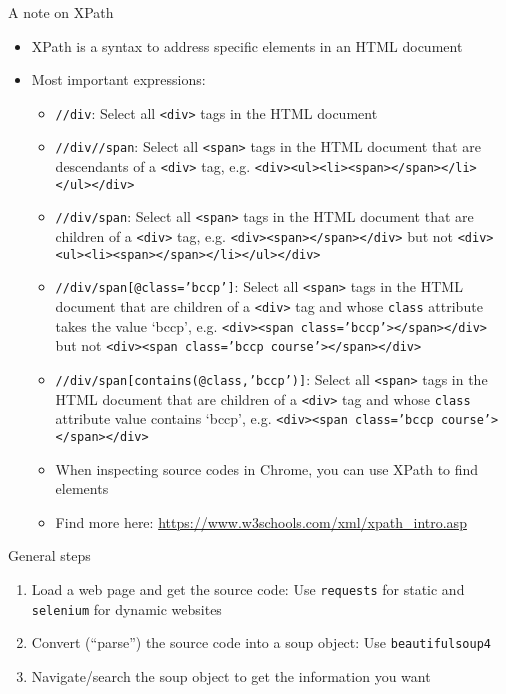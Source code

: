 \begin{frame}{A note on XPath}
\begin{itemize}
	\item XPath is a syntax to address specific elements in an HTML document
	\item Most important expressions:
	\begin{itemize}
		\item \texttt{//div}: Select all \texttt{<div>} tags in the HTML document
		\item \texttt{//div//span}: Select all \texttt{<span>} tags in the HTML document that are descendants of a \texttt{<div>} tag, e.g. \texttt{<div><ul><li><span></span></li></ul></div>}
		\item \texttt{//div/span}: Select all \texttt{<span>} tags in the HTML document that are children of a \texttt{<div>} tag, e.g. \texttt{<div><span></span></div>} but not \texttt{<div><ul><li><span></span></li></ul></div>}

\framebreak

		\item \texttt{//div/span[@class='bccp']}: Select all \texttt{<span>} tags in the HTML document that are children of a \texttt{<div>} tag and whose \texttt{class} attribute takes the value `bccp', e.g. \texttt{<div><span class='bccp'></span></div>} but not \texttt{<div><span class='bccp course'></span></div>}
		\item \texttt{//div/span[contains(@class,'bccp')]}: Select all \texttt{<span>} tags in the HTML document that are children of a \texttt{<div>} tag and whose \texttt{class} attribute value contains `bccp', e.g. \texttt{<div><span class='bccp course'></span></div>}
		\item When inspecting source codes in Chrome, you can use XPath to find elements
		\item Find more here: \url{https://www.w3schools.com/xml/xpath_intro.asp}
	\end{itemize}
\end{itemize}

\end{frame}

\begin{frame}[fragile]{General steps}
\begin{enumerate}
	\item Load a web page and get the source code: Use \texttt{requests} for static and \texttt{selenium} for dynamic websites
	\item Convert (``parse'') the source code into a soup object: Use \texttt{beautifulsoup4}
	\item Navigate/search the soup object to get the information you want
\end{enumerate}
\end{frame}

